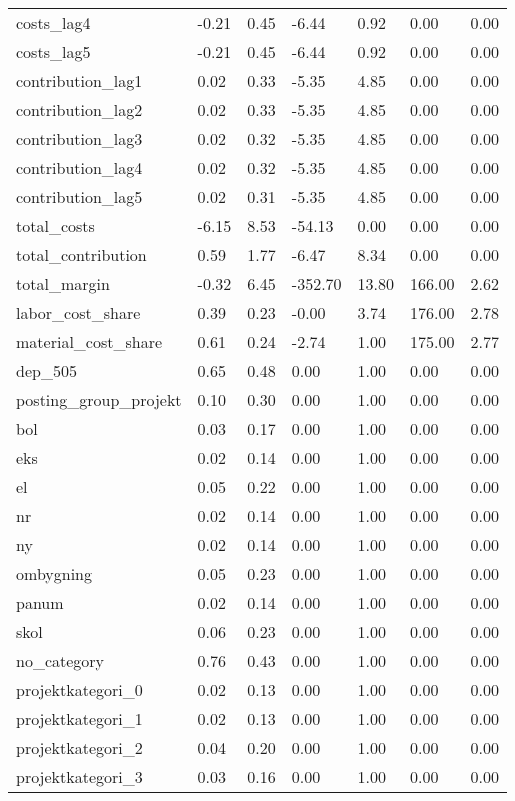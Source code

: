 \begin{landscape}
\begin{longtable}[h!]{lllllll}
costs_lag4 & -0.21 & 0.45 & -6.44 & 0.92 & 0.00 & 0.00 \\
costs_lag5 & -0.21 & 0.45 & -6.44 & 0.92 & 0.00 & 0.00 \\
contribution_lag1 & 0.02 & 0.33 & -5.35 & 4.85 & 0.00 & 0.00 \\
contribution_lag2 & 0.02 & 0.33 & -5.35 & 4.85 & 0.00 & 0.00 \\
contribution_lag3 & 0.02 & 0.32 & -5.35 & 4.85 & 0.00 & 0.00 \\
contribution_lag4 & 0.02 & 0.32 & -5.35 & 4.85 & 0.00 & 0.00 \\
contribution_lag5 & 0.02 & 0.31 & -5.35 & 4.85 & 0.00 & 0.00 \\
total_costs & -6.15 & 8.53 & -54.13 & 0.00 & 0.00 & 0.00 \\
total_contribution & 0.59 & 1.77 & -6.47 & 8.34 & 0.00 & 0.00 \\
total_margin & -0.32 & 6.45 & -352.70 & 13.80 & 166.00 & 2.62 \\
labor_cost_share & 0.39 & 0.23 & -0.00 & 3.74 & 176.00 & 2.78 \\
material_cost_share & 0.61 & 0.24 & -2.74 & 1.00 & 175.00 & 2.77 \\
dep_505 & 0.65 & 0.48 & 0.00 & 1.00 & 0.00 & 0.00 \\
posting_group_projekt & 0.10 & 0.30 & 0.00 & 1.00 & 0.00 & 0.00 \\
bol & 0.03 & 0.17 & 0.00 & 1.00 & 0.00 & 0.00 \\
eks & 0.02 & 0.14 & 0.00 & 1.00 & 0.00 & 0.00 \\
el & 0.05 & 0.22 & 0.00 & 1.00 & 0.00 & 0.00 \\
nr & 0.02 & 0.14 & 0.00 & 1.00 & 0.00 & 0.00 \\
ny & 0.02 & 0.14 & 0.00 & 1.00 & 0.00 & 0.00 \\
ombygning & 0.05 & 0.23 & 0.00 & 1.00 & 0.00 & 0.00 \\
panum & 0.02 & 0.14 & 0.00 & 1.00 & 0.00 & 0.00 \\
skol & 0.06 & 0.23 & 0.00 & 1.00 & 0.00 & 0.00 \\
no_category & 0.76 & 0.43 & 0.00 & 1.00 & 0.00 & 0.00 \\
projektkategori_0 & 0.02 & 0.13 & 0.00 & 1.00 & 0.00 & 0.00 \\
projektkategori_1 & 0.02 & 0.13 & 0.00 & 1.00 & 0.00 & 0.00 \\
projektkategori_2 & 0.04 & 0.20 & 0.00 & 1.00 & 0.00 & 0.00 \\
projektkategori_3 & 0.03 & 0.16 & 0.00 & 1.00 & 0.00 & 0.00 \\

\end{longtable}
\end{landscape}
